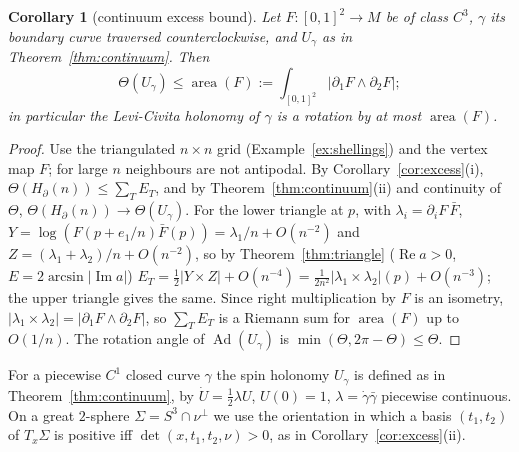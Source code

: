 \documentclass[11pt,reqno]{amsart}
\newtheorem{corollary}[theorem]{Corollary}
\theoremstyle{definition}
\theoremstyle{remark}
\numberwithin{equation}{section}
\newcommand{\Ad}{\operatorname{Ad}}
\newcommand{\re}{\operatorname{Re}}
\newcommand{\im}{\operatorname{Im}}
\begin{document}
\begin{corollary}[continuum excess bound]\label{cor:area}
Let $F\colon[0,1]^2\to M$ be of class $C^3$, $\gamma$ its boundary curve traversed counterclockwise, and $U_\gamma$ as in
Theorem~\ref{thm:continuum}.  Then
\[
\Theta(U_\gamma)\le\operatorname{area}(F):=\int_{[0,1]^2}\lvert\partial_1F\wedge\partial_2F\rvert ;
\]
in particular the Levi-Civita holonomy of $\gamma$ is a rotation by at most $\operatorname{area}(F)$.
\end{corollary}
\begin{proof}
Use the triangulated $n\times n$ grid (Example~\ref{ex:shellings}) and the vertex map $F$; for large $n$ neighbours are not
antipodal.  By Corollary~\ref{cor:excess}(i), $\Theta(H_\partial(n))\le\sum_TE_T$, and by Theorem~\ref{thm:continuum}(ii) and
continuity of $\Theta$, $\Theta(H_\partial(n))\to\Theta(U_\gamma)$.  For the lower triangle at $p$, with $\lambda_i=\partial_iF\,\bar F$,
$Y=\log(F(p+e_1/n)\bar F(p))=\lambda_1/n+O(n^{-2})$ and $Z=(\lambda_1+\lambda_2)/n+O(n^{-2})$, so by Theorem~\ref{thm:triangle}
($\re a>0$, $E=2\arcsin\lvert\im a\rvert$) $E_T=\tfrac12\lvert Y\times Z\rvert+O(n^{-4})=\tfrac1{2n^2}\lvert\lambda_1\times\lambda_2\rvert(p)+O(n^{-3})$;
the upper triangle gives the same.  Since right multiplication by $F$ is an isometry,
$\lvert\lambda_1\times\lambda_2\rvert=\lvert\partial_1F\wedge\partial_2F\rvert$, so $\sum_TE_T$ is a Riemann sum for
$\operatorname{area}(F)$ up to $O(1/n)$.  The rotation angle of $\Ad(U_\gamma)$ is $\min(\Theta,2\pi-\Theta)\le\Theta$.
\end{proof}

For a piecewise $C^1$ closed curve $\gamma$ the spin holonomy $U_\gamma$ is defined as in Theorem~\ref{thm:continuum}, by
$\dot U=\tfrac12\lambda U$, $U(0)=1$, $\lambda=\dot\gamma\bar\gamma$ piecewise continuous.  On a great $2$-sphere $\Sigma=S^3\cap\nu^\perp$ we use the
orientation in which a basis $(t_1,t_2)$ of $T_x\Sigma$ is positive iff $\det(x,t_1,t_2,\nu)>0$, as in Corollary~\ref{cor:excess}(ii).
\end{document}
